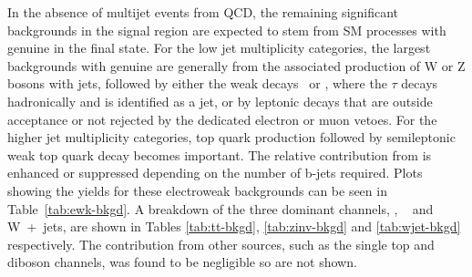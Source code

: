 In the absence of multijet events from QCD, the remaining significant
backgrounds in the signal region are expected to stem from SM
processes with genuine \met in the final state. For the low jet
multiplicity categories, the largest backgrounds with genuine \met are
generally from the associated production of W or Z bosons with jets,
followed by either the weak decays \znunu\ or \wtaunu, where the
$\tau$ decays hadronically and is identified as a jet, or by leptonic
decays that are outside acceptance or not rejected by the dedicated
electron or muon vetoes. For the higher jet multiplicity categories,
top quark production followed by semileptonic weak top quark decay
becomes important. The relative contribution from \ttbar is enhanced
or suppressed depending on the number of b-jets required. 
Plots showing the yields for these electroweak backgrounds can be seen in Table~\ref{tab:ewk-bkgd}.
A breakdown of the three
dominant channels, \ttbar, \zInv~ and W~+~jets, are shown in Tables \ref{tab:tt-bkgd}, 
\ref{tab:zinv-bkgd} and \ref{tab:wjet-bkgd} respectively. The contribution from
other sources, such as the single top and diboson channels, was found to be
negligible so are not shown.
